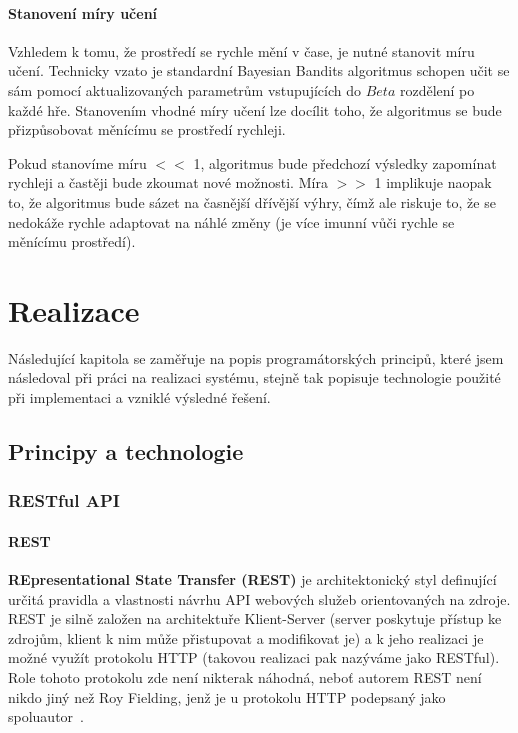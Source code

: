 \documentclass[thesis=M,czech]{FITthesis}[2014/05/07]
\begin{document}
\subsubsection{Stanovení míry učení}
Vzhledem k tomu, že prostředí se rychle mění v čase, je nutné stanovit míru učení. Technicky vzato je standardní Bayesian Bandits algoritmus schopen učit se sám pomocí aktualizovaných parametrům vstupujících do ${Beta}$ rozdělení po každé hře. Stanovením vhodné míry učení lze docílit toho, že algoritmus se bude přizpůsobovat měnícímu se prostředí rychleji.

Pokud stanovíme míru $<<$ 1, algoritmus bude předchozí výsledky zapomínat rychleji a častěji bude zkoumat nové možnosti. Míra $>>$ 1 implikuje naopak to, že algoritmus bude sázet na časnější dřívější výhry, čímž ale riskuje to, že se nedokáže rychle adaptovat na náhlé změny (je více imunní vůči rychle se měnícímu prostředí).
	
\chapter{Realizace}
\label{chap:impl}

Následující kapitola se zaměřuje na popis programátorských principů, které jsem následoval při práci na realizaci systému, stejně tak popisuje technologie použité při implementaci a vzniklé výsledné řešení.

\section{Principy a technologie}
\label{sec:sysanalys}

\subsection{RESTful API}
\label{rest}
\subsubsection{REST}
\textbf{REpresentational State Transfer (REST)} je architektonický styl definující určitá pravidla a vlastnosti návrhu API webových služeb orientovaných na zdroje. REST je silně založen na architektuře Klient-Server (server poskytuje přístup ke zdrojům, klient k nim může přistupovat a modifikovat je) a k jeho realizaci je možné využít protokolu HTTP (takovou realizaci pak nazýváme jako RESTful). Role tohoto protokolu zde není nikterak náhodná, neboť autorem REST není nikdo jiný než Roy Fielding, jenž je u protokolu HTTP podepsaný jako spoluautor~\cite{Fielding:2000:ASD:932295}. 
\end{document}
